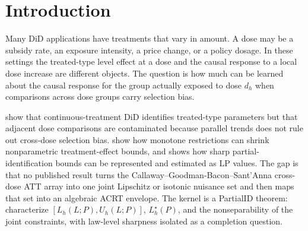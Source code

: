 \documentclass[11pt]{article}
\theoremstyle{definition}
\theoremstyle{plain}
\theoremstyle{remark}
\begin{document}
\begin{abstract}
Continuous-treatment DiD identifies treated-type dose effects under generalized
parallel trends, but adjacent dose comparisons remain contaminated by
cross-dose selection terms.  This proposal asks whether structural regularity
of the full cross-dose array \(\operatorname{ATT}(l\mid d)\) can turn those
unidentified terms into an algebraic finite-grid envelope for
\(\operatorname{ACRT}(d)\).  The kernel claim is that the ACRT envelope is the
support-function image of one joint Lipschitz or isotonic nuisance polytope,
not a coordinatewise observed-contrast interval formed by bounding each
selection-bias term separately.  The proposal also singles out the critical
Lipschitz constant \(L_h^\star\) at which zero first enters the envelope and a
small witness where joint constraints strictly sharpen marginal local bounds.
A plug-in relaxed-LP estimator would make the algebraic envelope and the sign
frontier usable in empirical continuous-dose DiD applications, with causal
law sharpness left to a latent-completion conjecture.
\end{abstract}

\section{Introduction}
Many DiD applications have treatments that vary in amount.  A dose may be a
subsidy rate, an exposure intensity, a price change, or a policy dosage.  In
these settings the treated-type level effect at a dose and the causal response
to a local dose increase are different objects.  The question is how much can
be learned about the causal response for the group actually exposed to dose
\(d_h\) when comparisons across dose groups carry selection bias.

\citet[Sections 3--4]{CallawayGoodmanBaconSantAnna2021} show that
continuous-treatment DiD identifies treated-type parameters but that adjacent
dose comparisons are contaminated because parallel trends does not rule out
cross-dose selection bias.  \citet{ManskiPepper2000} show how monotone
restrictions can shrink nonparametric treatment-effect bounds, and
\citet{Voronin2025} shows how sharp partial-identification bounds can be
represented and estimated as LP values.  The gap is that no published result
turns the Callaway--Goodman-Bacon--Sant'Anna cross-dose ATT array into one
joint Lipschitz or isotonic nuisance set and then maps that set into an
algebraic ACRT envelope.  The kernel is a PartialID theorem: characterize
\([L_h(L;P),U_h(L;P)]\), \(L_h^\star(P)\), and the nonseparability of the joint
constraints, with law-level sharpness isolated as a completion question.
\end{document}
